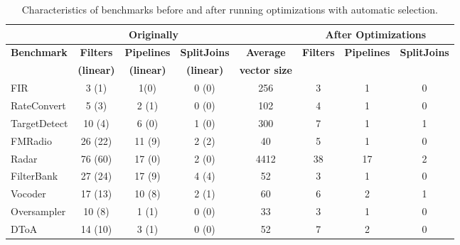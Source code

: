 \begin{table}[t]
\begin{minipage}{7in}
\vspace{-8pt}
\begin{center}
{\small
\begin{tabular}{|l|c|c|c||c||c|c|c|} 
\hline
& \multicolumn{3}{|c||}{{\bf Originally}}  &             & \multicolumn{3}{|c|}{{\bf After Optimizations}} \\
\hline
{\bf Benchmark}  & {\bf Filters} & {\bf Pipelines} & {\bf SplitJoins} & {\bf Average}     & {\bf Filters}      & {\bf Pipelines}         & {\bf SplitJoins} \\
           & {\bf (linear)}& {\bf (linear)} & {\bf (linear)}   & {\bf vector size} &              &                   &            \\
\hline
FIR        & 3 (1)   & 1(0)     & 0 (0)      & 256         & 3            & 1                 & 0 \\
\hline
RateConvert& 5 (3)   & 2 (1)    & 0 (0)      & 102         & 4            & 1                 & 0 \\
\hline
TargetDetect& 10 (4) & 6 (0)    & 1 (0)      & 300         & 7            & 1                 & 1 \\
\hline
FMRadio    & 26 (22) & 11 (9)   & 2 (2)      & 40          & 5            & 1                 & 0 \\
\hline
Radar      & 76 (60) & 17 (0)   & 2 (0)      & 4412        & 38           & 17                & 2 \\
\hline
FilterBank & 27 (24) & 17 (9)   & 4 (4)      & 52          & 3            & 1                 & 0 \\
\hline
Vocoder    & 17 (13) & 10 (8)   & 2 (1)      & 60          & 6            & 2                 & 1 \\
\hline
Oversampler& 10 (8) & 1 (1)     & 0 (0)      & 33          & 3            & 1                 & 0 \\
\hline
DToA       & 14 (10) & 3 (1)    & 0 (0)      & 52          & 7            & 2                 & 0 \\
\hline
\end{tabular}}
\vspace{-3pt}
\caption{Characteristics of benchmarks before and after running optimizations with automatic selection.
\protect\label{fig:benchmark-statistics}}
\end{center}
\vspace{-20pt}
\makeline
\vspace{-12pt}
\end{minipage}
\end{table}

